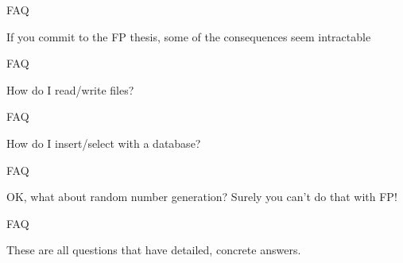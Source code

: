 \begin{frame}
\begin{block}{FAQ}
\begin{center}
If you commit to the FP thesis, some of the consequences seem intractable
\end{center}
\end{block}
\end{frame}

\begin{frame}
\begin{block}{FAQ}
\begin{center}
How do I read/write files?
\end{center}
\end{block}
\end{frame}

\begin{frame}
\begin{block}{FAQ}
\begin{center}
How do I insert/select with a database?
\end{center}
\end{block}
\end{frame}

\begin{frame}
\begin{block}{FAQ}
\begin{center}
OK, what about random number generation? Surely you can't do that with FP!
\end{center}
\end{block}
\end{frame}

\begin{frame}
\begin{block}{FAQ}
\begin{center}
These are all questions that have detailed, concrete answers.
\end{center}
\end{block}
\end{frame}
